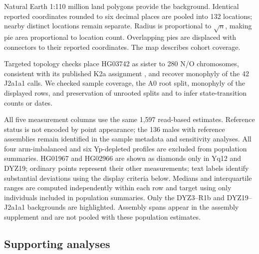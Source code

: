 Natural Earth 1:110 million land polygons provide the background. Identical reported coordinates rounded to six decimal places are pooled into 132 locations; nearby distinct locations remain separate. Radius is proportional to $\sqrt n$, making pie area proportional to location count. Overlapping pies are displaced with connectors to their reported coordinates. The map describes cohort coverage.

Targeted topology checks place HG03742 as sister to 280 N/O chromosomes, consistent with its published K2a assignment \cite{Poznik2016}, and recover monophyly of the 42 J2a1a1 calls. We checked sample coverage, the A0 root split, monophyly of the displayed rows, and preservation of unrooted splits and  to infer state-transition counts or dates.

All five measurement columns use the same 1,597 read-based estimates. Reference status is not encoded by point appearance; the 136 males with reference assemblies remain identified in the sample metadata and sensitivity analyses. All four arm-imbalanced and six Yp-depleted profiles are excluded from population summaries. HG01967 and HG02966 are shown as diamonds only in Yq12 and DYZ19; ordinary points represent their other measurements; text labels identify substantial deviations using the display criteria below. Medians and interquartile ranges are computed independently within each row and target using only individuals included in population summaries. Only the DYZ3--R1b and DYZ19--J2a1a1 backgrounds are highlighted. Assembly spans appear in the assembly supplement and are not pooled with these population estimates.

\subsection{Supporting analyses}\label{sec:m-supporting}

